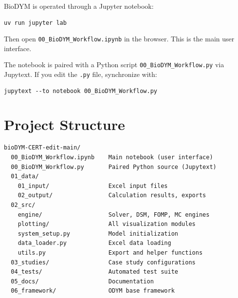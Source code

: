 BioDYM is operated through a Jupyter notebook:

\begin{lstlisting}[style=bash]
uv run jupyter lab
\end{lstlisting}

Then open \texttt{00\_BioDYM\_Workflow.ipynb} in the browser. This is the main user interface.

\begin{tipbox}
The notebook is paired with a Python script \texttt{00\_BioDYM\_Workflow.py} via Jupytext. If you edit the \texttt{.py} file, synchronize with:
\begin{lstlisting}[style=bash]
jupytext --to notebook 00_BioDYM_Workflow.py
\end{lstlisting}
\end{tipbox}

\section{Project Structure}

\begin{lstlisting}
bioDYM-CERT-edit-main/
  00_BioDYM_Workflow.ipynb    Main notebook (user interface)
  00_BioDYM_Workflow.py       Paired Python source (Jupytext)
  01_data/
    01_input/                 Excel input files
    02_output/                Calculation results, exports
  02_src/
    engine/                   Solver, DSM, FOMP, MC engines
    plotting/                 All visualization modules
    system_setup.py           Model initialization
    data_loader.py            Excel data loading
    utils.py                  Export and helper functions
  03_studies/                 Case study configurations
  04_tests/                   Automated test suite
  05_docs/                    Documentation
  06_framework/               ODYM base framework
\end{lstlisting}
